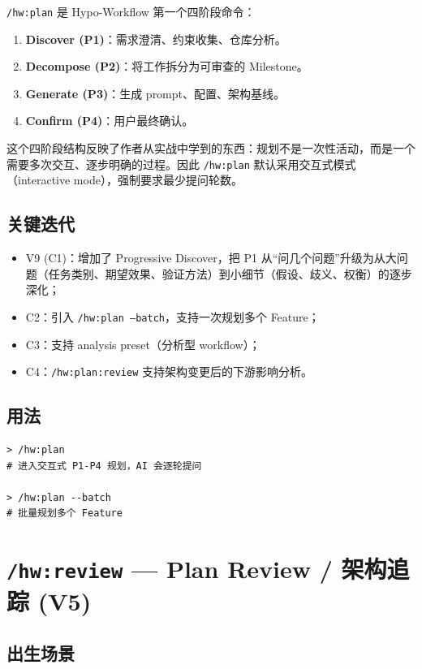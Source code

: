 \documentclass[
  outputdir=build,
  chapterstyle=cn,
  colorscheme=Simple,
  fontset=tech,
  code=false
]{Hypo-Note}
\begin{document}
\texttt{/hw:plan} 是 Hypo-Workflow 第一个四阶段命令：

\begin{enumerate}[leftmargin=2em]
  \item \textbf{Discover (P1)}：需求澄清、约束收集、仓库分析。
  \item \textbf{Decompose (P2)}：将工作拆分为可审查的 Milestone。
  \item \textbf{Generate (P3)}：生成 prompt、配置、架构基线。
  \item \textbf{Confirm (P4)}：用户最终确认。
\end{enumerate}

这个四阶段结构反映了作者从实战中学到的东西：规划不是一次性活动，而是一个需要多次交互、逐步明确的过程。因此 \texttt{/hw:plan} 默认采用交互式模式（interactive mode），强制要求最少提问轮数。

\subsection{关键迭代}

\begin{itemize}[leftmargin=2em]
  \item V9 (C1)：增加了 Progressive Discover，把 P1 从“问几个问题”升级为从大问题（任务类别、期望效果、验证方法）到小细节（假设、歧义、权衡）的逐步深化；
  \item C2：引入 \texttt{/hw:plan --batch}，支持一次规划多个 Feature；
  \item C3：支持 analysis preset（分析型 workflow）；
  \item C4：\texttt{/hw:plan:review} 支持架构变更后的下游影响分析。
\end{itemize}

\subsection{用法}

\begin{lstlisting}[caption=启动规划流程]
> /hw:plan
# 进入交互式 P1-P4 规划，AI 会逐轮提问

> /hw:plan --batch
# 批量规划多个 Feature
\end{lstlisting}

\section{\texttt{/hw:review} — Plan Review / 架构追踪 (V5)}

\subsection{出生场景}
\end{document}
